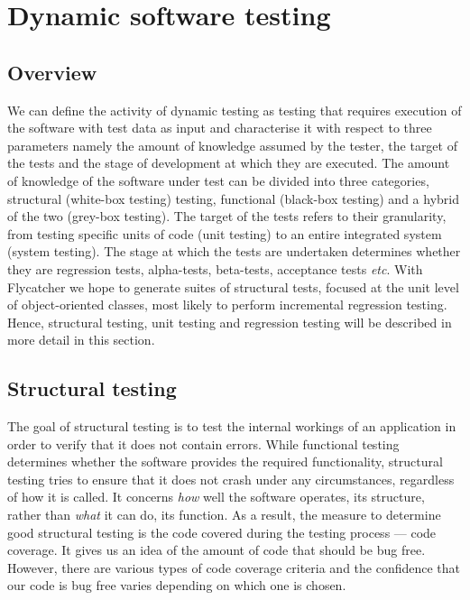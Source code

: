 \documentclass[a4paper,11pt,titlepage]{report}
\begin{document}
\section{Dynamic software testing}

\subsection{Overview}

We can define the activity of dynamic testing as testing that requires execution of the software with test data as input \cite{mahmood2007systematic} and characterise it with respect to three parameters namely the amount of knowledge assumed by the tester, the target of the tests and the stage of development at which they are executed. The amount of knowledge of the software under test can be divided into three categories, structural (white-box testing) testing, functional (black-box testing) and a hybrid of the two (grey-box testing). The target of the tests refers to their granularity, from testing specific units of code (unit testing) to an entire integrated system (system testing). The stage at which the tests are undertaken determines whether they are regression tests, alpha-tests, beta-tests, acceptance tests \emph{etc}. With \textsf{Flycatcher} we hope to generate suites of structural tests, focused at the unit level of object-oriented classes, most likely to perform incremental regression testing. Hence, structural testing, unit testing and regression testing will be described in more detail in this section.

\subsection{Structural testing}

The goal of structural testing is to test the internal workings \cite{mcminn2004search} of an application in order to verify that it does not contain errors. While functional testing determines whether the software provides the required functionality, structural testing tries to ensure that it does not crash under any circumstances, regardless of how it is called. It concerns \emph{how} well the software operates, its structure, rather than \emph{what} it can do, its function. As a result, the measure to determine good structural testing is the code covered during the testing process --- code coverage. It gives us an idea of the amount of code that should be bug free. However, there are various types of code coverage criteria and the confidence that our code is bug free varies depending on which one is chosen.
\end{document}
